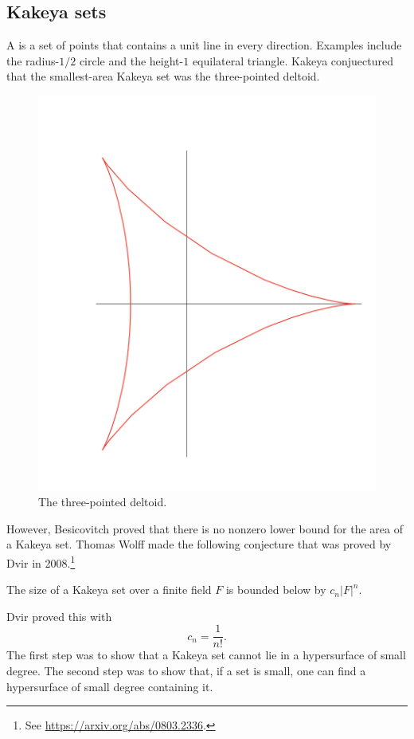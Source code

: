 \documentclass [11 pt, oneside, margin = 1 in] {article}
\begin{document}
\subsection{Kakeya sets}
A  is a set of points that contains a unit line in every direction. Examples include the radius-$1/2$ circle and the height-$1$ equilateral triangle. Kakeya conjuectured that the smallest-area Kakeya set was the three-pointed deltoid.

\begin{figure}
	\begin{center}
		\includegraphics[scale=0.5]{images/kakeya_deltoid}
		\caption{The three-pointed deltoid.}
	\end{center}
\end{figure}

However, Besicovitch proved that there is no nonzero lower bound for the area of a Kakeya set. Thomas Wolff made the following conjecture that was proved by Dvir in 2008.\footnote{See \url{https://arxiv.org/abs/0803.2336}.}
\begin{theorem}\label{}\index{}\text{}
The size of a Kakeya set over a finite field $F$ is bounded below by $c_n\left\lvert F \right\rvert ^n$.
\end{theorem}
Dvir proved this with $$c_n = \frac{1}{n!}.$$ The first step was to show that a Kakeya set cannot lie in a hypersurface of small degree. The second step was to show that, if a set is small, one can find a hypersurface of small degree containing it.
\end{document}
